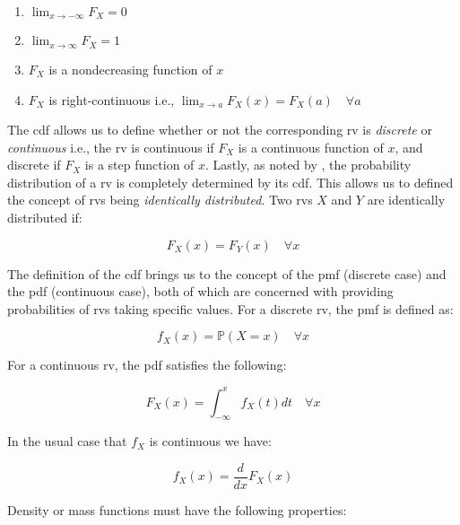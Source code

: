 \documentclass{report}
\begin{document}
\begin{enumerate}
    \item $\lim_{x \to -\infty} F_X = 0$
    \item $\lim_{x \to \infty} F_X = 1$
    \item $F_X$ is a nondecreasing function of $x$ 
    \item $F_X$ is right-continuous i.e., $\lim_{x \to a} F_X(x) = F_X(a) \quad \forall a$
\end{enumerate}

The \gls{cdf} allows us to define whether or not the corresponding \gls{rv} is \textit{discrete} or \textit{continuous} i.e., the \gls{rv} is continuous if $F_X$ is a continuous function of $x$, and discrete if $F_X$ is a step function of $x$. Lastly, as noted by \cite[Chapter~1.5]{casella_statistical_2002}, the probability distribution of a \gls{rv} is completely determined by its \gls{cdf}. This allows us to defined the concept of \glspl{rv} being \textit{identically distributed}. Two \glspl{rv} $X$ and $Y$ are identically distributed if:

\begin{equation}\label{eq:identically-distributed}
    F_X(x) = F_Y(x) \quad \forall x
\end{equation}

The definition of the \gls{cdf} brings us to the concept of the \gls{pmf} (discrete case) and the \gls{pdf} (continuous case), both of which are concerned with providing probabilities of \glspl{rv} taking specific values. For a discrete \gls{rv}, the \gls{pmf} is defined as:

\begin{equation}\label{eq:pmf}
    f_X(x) = \mathbb{P}(X = x) \quad \forall x
\end{equation}

For a continuous \gls{rv}, the \gls{pdf} satisfies the following:

\begin{equation}\label{eq:pdf-1}
    F_X(x) = \int_{-\infty}^x f_X(t) dt \quad \forall x
\end{equation}

In the usual case that $f_X$ is continuous we have:

\begin{equation}\label{eq:pdf-2}
    f_X(x) = \frac{d}{dx} F_X(x) 
\end{equation}

Density or mass functions must have the following properties:
\end{document}

